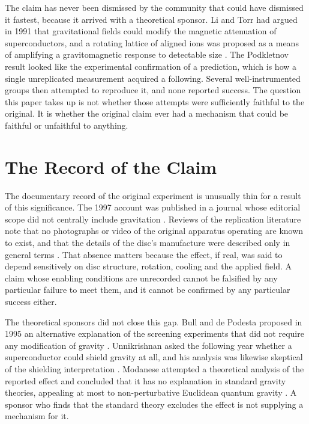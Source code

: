 \documentclass[11pt]{article}
\begin{document}
The claim has never been dismissed by the community that could have dismissed it fastest, because it arrived with a theoretical sponsor. Li and Torr had argued in 1991 that gravitational fields could modify the magnetic attenuation of superconductors, and a rotating lattice of aligned ions was proposed as a means of amplifying a gravitomagnetic response to detectable size \cite{LT1991}. The Podkletnov result looked like the experimental confirmation of a prediction, which is how a single unreplicated measurement acquired a following. Several well-instrumented groups then attempted to reproduce it, and none reported success. The question this paper takes up is not whether those attempts were sufficiently faithful to the original. It is whether the original claim ever had a mechanism that could be faithful or unfaithful to anything.

\section{The Record of the Claim}

The documentary record of the original experiment is unusually thin for a result of this significance. The 1997 account was published in a journal whose editorial scope did not centrally include gravitation \cite{P1997}. Reviews of the replication literature note that no photographs or video of the original apparatus operating are known to exist, and that the details of the disc's manufacture were described only in general terms \cite{GMU2022}. That absence matters because the effect, if real, was said to depend sensitively on disc structure, rotation, cooling and the applied field. A claim whose enabling conditions are unrecorded cannot be falsified by any particular failure to meet them, and it cannot be confirmed by any particular success either.

The theoretical sponsors did not close this gap. Bull and de Podesta proposed in 1995 an alternative explanation of the screening experiments that did not require any modification of gravity \cite{DPB1995}. Unnikrishnan asked the following year whether a superconductor could shield gravity at all, and his analysis was likewise skeptical of the shielding interpretation \cite{U1996}. Modanese attempted a theoretical analysis of the reported effect and concluded that it has no explanation in standard gravity theories, appealing at most to non-perturbative Euclidean quantum gravity \cite{M1995}. A sponsor who finds that the standard theory excludes the effect is not supplying a mechanism for it.
\end{document}
